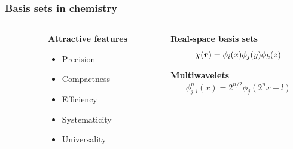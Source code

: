 \begin{frame}
    \frametitle{Basis sets in chemistry}
    \begin{columns}
    \begin{column}{.10\textwidth}
    \end{column}
    \begin{column}{.30\textwidth}
    \textbf{Attractive features}
    \begin{itemize}
        \item {\color{green} Precision}
        \item {\color{red} Compactness}
        \item {\color{green} Efficiency}
        \item {\color{green} Systematicity}
        \item {\color{green} Universality}
    \end{itemize}
    \end{column}
    \begin{column}{.60\textwidth}
    \centering
    \textbf{Real-space basis sets}
    \begin{equation}
        \nonumber
        \chi(\boldsymbol r) = \phi_i(x)\phi_j(y)\phi_k(z)
    \end{equation}

    \vspace{4.2mm}

    \textbf{Multiwavelets}
    \begin{equation}
        \nonumber
        \phi_{j,l}^n(x) = 2^{n/2}\phi_j(2^nx-l)
    \end{equation}
    \end{column}
    \end{columns}

    \vspace{5mm}


\end{frame}
